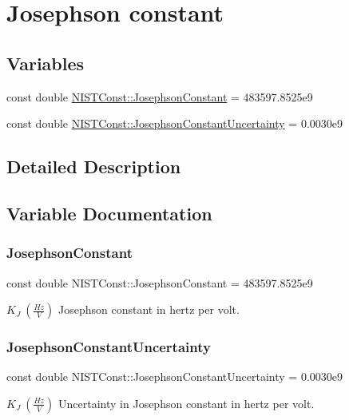 \hypertarget{group___josephson_constant}{}\section{Josephson constant}
\label{group___josephson_constant}
\subsection*{Variables}
\begin{DoxyCompactItemize}
\item 
const double \hyperlink{group___josephson_constant_gae9f3553a6a6c5eed3df61ad33277cab8}{N\+I\+S\+T\+Const\+::\+Josephson\+Constant} = 483597.\+8525e9
\item 
const double \hyperlink{group___josephson_constant_gaa10eadf7c1811f94c5b5725ad300a099}{N\+I\+S\+T\+Const\+::\+Josephson\+Constant\+Uncertainty} = 0.\+0030e9
\end{DoxyCompactItemize}


\subsection{Detailed Description}


\subsection{Variable Documentation}
\mbox{\label{group___josephson_constant_gae9f3553a6a6c5eed3df61ad33277cab8}} 
\subsubsection{\texorpdfstring{Josephson\+Constant}{JosephsonConstant}}
{\footnotesize\ttfamily const double N\+I\+S\+T\+Const\+::\+Josephson\+Constant = 483597.\+8525e9}

$K_J \ (\frac{Hz}{V})$ Josephson constant in hertz per volt. \mbox{\label{group___josephson_constant_gaa10eadf7c1811f94c5b5725ad300a099}} 
\subsubsection{\texorpdfstring{Josephson\+Constant\+Uncertainty}{JosephsonConstantUncertainty}}
{\footnotesize\ttfamily const double N\+I\+S\+T\+Const\+::\+Josephson\+Constant\+Uncertainty = 0.\+0030e9}

$K_J \ (\frac{Hz}{V})$ Uncertainty in Josephson constant in hertz per volt. 